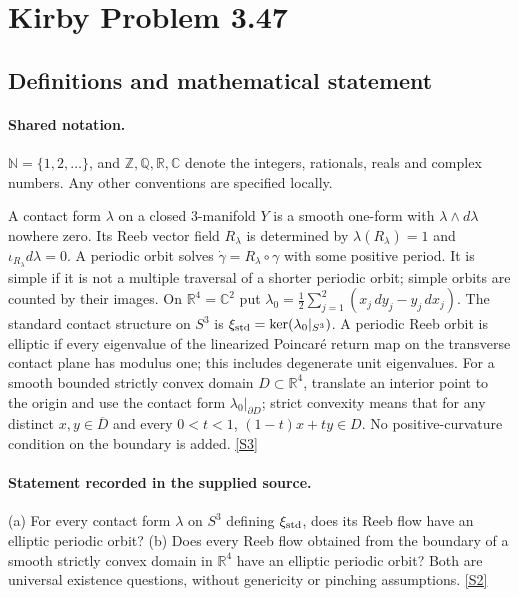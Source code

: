 \documentclass[11pt]{article}
\newcommand{\sref}[2]{\hyperlink{source:#1:#2}{[S#2]}}
\begin{document}
\section{Kirby Problem 3.47}\label{statement}

\subsection{Definitions and mathematical statement}

\paragraph{Shared notation.}$\mathbb N=\{1,2,\ldots\}$, and $\mathbb Z,\mathbb Q,\mathbb R,\mathbb C$ denote the integers, rationals, reals and complex numbers. Any other conventions are specified locally.


A contact form $\lambda$ on a closed $3$-manifold $Y$ is a smooth one-form with $\lambda\wedge d\lambda$ nowhere zero. Its Reeb vector field $R_\lambda$ is determined by $\lambda(R_\lambda)=1$ and $\iota_{R_\lambda}d\lambda=0$. A periodic orbit solves $\dot\gamma=R_\lambda\circ\gamma$ with some positive period. It is simple if it is not a multiple traversal of a shorter periodic orbit; simple orbits are counted by their images. On $\mathbb R^4=\mathbb C^2$ put $\lambda_0=\tfrac12\sum_{j=1}^2(x_j\,dy_j-y_j\,dx_j)$. The standard contact structure on $S^3$ is $\xi_{\rm std}=\ker(\lambda_0|_{S^3})$. A periodic Reeb orbit is elliptic if every eigenvalue of the linearized Poincar\'e return map on the transverse contact plane has modulus one; this includes degenerate unit eigenvalues. For a smooth bounded strictly convex domain $D\subset\mathbb R^4$, translate an interior point to the origin and use the contact form $\lambda_0|_{\partial D}$; strict convexity means that for any distinct $x,y\in\overline D$ and every $0<t<1$, $(1-t)x+ty\in D$. No positive-curvature condition on the boundary is added. \sref{statement}{3}
\paragraph{Statement recorded in the supplied source.}
(a) For every contact form $\lambda$ on $S^3$ defining $\xi_{\rm std}$, does its Reeb flow have an elliptic periodic orbit? (b) Does every Reeb flow obtained from the boundary of a smooth strictly convex domain in $\mathbb R^4$ have an elliptic periodic orbit? Both are universal existence questions, without genericity or pinching assumptions. \sref{statement}{2}
\end{document}
